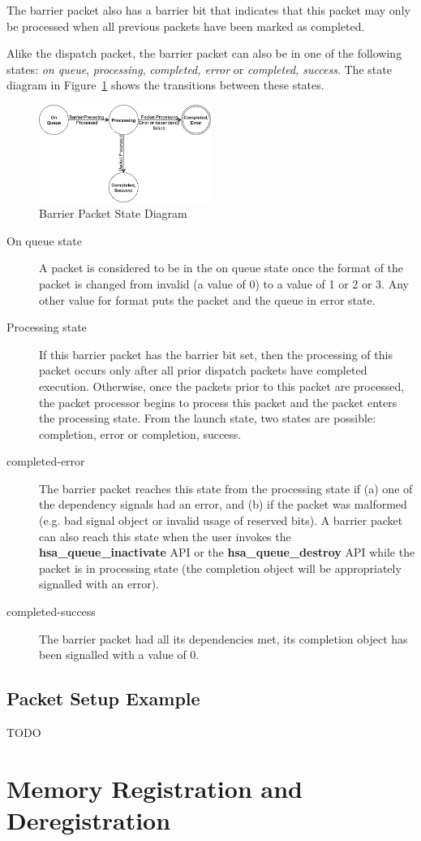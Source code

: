 \documentclass{book}
\newcommand{\reffun}[1]{\textbf{#1}}
\begin{document}
The barrier packet also has a barrier bit that indicates that this
packet may only be processed when all previous packets have been
marked as completed.

Alike the dispatch packet, the barrier packet can also be in one of
the following states: \emph{on queue}, \emph{processing},
\emph{completed, error} or \emph{completed, success}. The state
diagram in Figure~\ref{fig:barrierpacketstate} shows the transitions
between these states.

\begin{figure}
  \centering
  \includegraphics[width=0.5\textwidth] {fig/barrierpacketstate}
  \centering
  \caption{Barrier Packet State Diagram}
  \label{fig:barrierpacketstate}
\end{figure}

\begin{description}
\item[On queue state] A packet is considered to be in the on queue
state once the format of the packet is changed from invalid (a value
of 0) to a value of 1 or 2 or 3. Any other value for format puts the
packet and the queue in error state.
\item[Processing state] If this barrier packet has the barrier bit set,
then the processing of this packet occurs only after all prior
dispatch packets have completed execution.  Otherwise, once the
packets prior to this packet are processed, the packet processor
begins to process this packet and the packet enters the processing
state.  From the launch state, two states are possible: completion,
error or completion, success.
\item[completed-error] The barrier packet reaches this state from
the processing state if (a) one of the dependency signals had an
error, and (b) if the packet was malformed (e.g. bad signal object
or invalid usage of reserved bits). A barrier packet can also reach
this state when the user invokes the \reffun{hsa\_queue\_inactivate}
API or the \reffun{hsa\_queue\_destroy} API while the packet is in
processing state (the completion object will be appropriately
signalled with an error).
\item[completed-success] The barrier packet had all its dependencies
met, its completion object has been signalled with a value of 0.
\end{description}
\hypertarget{aql_example}{}\subsection{Packet Setup
Example}\label{aql_example}
TODO
\hypertarget{coreapi_memory_registration}{}\section{Memory Registration and Deregistration}\label{coreapi_memory_registration}
\end{document}
